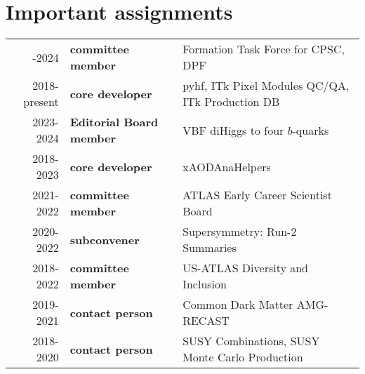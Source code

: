 \vspace{-4.5em}\section{Important assignments}\label{sec:important-assignments}
{
	\footnotesize
	\begin{tabular}{r|>{\bfseries}ll}
		\centering
		2023-2024    & committee member       & Formation Task Force for CPSC, DPF               \\
		2018-present & core developer         & pyhf, ITk Pixel Modules QC/QA, ITk Production DB \\
		2023-2024    & Editorial Board member & VBF diHiggs to four $b$-quarks                   \\
		2018-2023    & core developer         & xAODAnaHelpers                                   \\
		2021-2022    & committee member       & ATLAS Early Career Scientist Board               \\
		2020-2022    & subconvener            & Supersymmetry: Run-2 Summaries                   \\
		2018-2022    & committee member       & US-ATLAS Diversity and Inclusion                 \\
		2019-2021    & contact person         & Common Dark Matter AMG-RECAST                    \\
		2018-2020    & contact person         & SUSY Combinations, SUSY Monte Carlo Production   \\
	\end{tabular}
}

